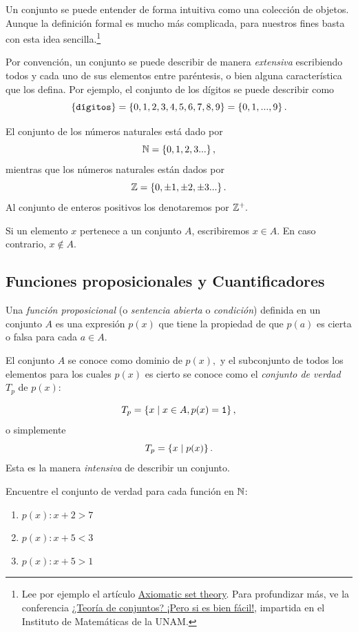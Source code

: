 Un conjunto se puede entender de forma intuitiva como una colección de objetos. Aunque la definición formal es mucho más complicada, para nuestros fines basta con esta idea sencilla.\footnote{Lee por ejemplo el artículo \href{https://www.britannica.com/science/set-theory/Axiomatic-set-theory}{Axiomatic set theory}. Para profundizar más, ve la conferencia \href{https://youtu.be/hLFit88zTYk}{¿Teoría de conjuntos? ¡Pero si es bien fácil!}, impartida en el Instituto de Matemáticas de la UNAM.}

Por convención, un conjunto se puede describir de manera \emph{extensiva} escribiendo todos y cada uno de sus elementos entre paréntesis, o bien alguna característica que los defina. Por ejemplo, el conjunto de los dígitos se puede describir como
\[
	\left\{ \texttt{dígitos} \right\}=\left\{ 0,1,2,3,4,5,6,7,8,9 \right\}=\left\{ 0,1,...,9 \right\}.
\]

	El conjunto de los números naturales está dado por
	\[ \mathbb{N} = \left\{ 0,1,2,3... \right\} ,\]	
	mientras que los números naturales están dados por 
	\[ \mathbb{Z} = \left\{ 0,\pm 1, \pm 2, \pm 3... \right\} .\]	
	Al conjunto de enteros positivos los denotaremos por $ \mathbb{Z}^{+}. $
	
		Si un elemento $ x $ pertenece a un conjunto $ A $, escribiremos $ x\in A $. En caso contrario, $ x\not \in A $.

\subsection{Funciones proposicionales y Cuantificadores}


 Una \emph{función proposicional} (o \emph{sentencia abierta} o \emph{condición}) definida en un conjunto $A$ es una expresión $p(x)$ que tiene la propiedad de que $p(a)$ es cierta o falsa para cada $a \in A.$



 El conjunto $A$ se conoce como dominio de $p(x),$ y el subconjunto de todos los elementos para los cuales $p(x)$ es cierto se conoce como el \emph{conjunto de verdad} $T_{p}$ de $p(x):$
 
 $$T_{p}=\left\{ x \mid x\in A, p(x)=\texttt{1} \right\},$$ 
 o simplemente 
 $$
 T_{p}=\left\{ x \mid p(x) \right\}.
 $$
Esta es la manera \emph{intensiva} de describir un conjunto.



 \begin{problema}
  \label{lip:exmp:4.7}
  Encuentre el conjunto de verdad para cada función en $\mathbb{N}$:
  \begin{enumerate}
   \item $p(x): x+2>7$ 
   \item $p(x): x+5<3$ 
   \item $p(x): x+5>1$ 
  \end{enumerate}

 \end{problema}



